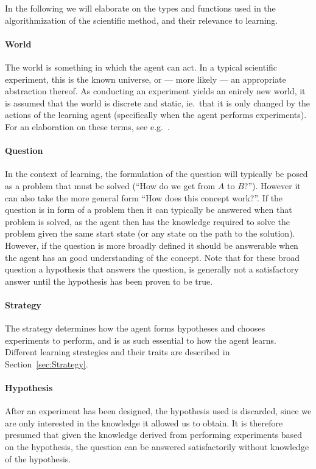 \documentclass[\master/Master.tex]{subfiles}
\begin{document}
In the following we will elaborate on the types and functions used in the algorithmization of the scientific method, and their relevance to learning.

\paragraph*{World}
The world is something in which the agent can act. In a typical scientific experiment, this is the known universe, or --- more likely --- an appropriate abstraction thereof. As conducting an experiment yields an enirely new world, it is assumed that the world is discrete and static, ie.\ that it is only changed by the actions of the learning agent (specifically when the agent performs experiments). For an elaboration on these terms, see e.g.~\cite{Russell}. 

\paragraph*{Question}
In the context of learning, the formulation of the question will typically be posed as a problem that must be solved (``How do we get from $A$ to $B$?'').
However it can also take the more general form ``How does this concept work?''.
If the question is in form of a problem then it can typically be answered when that problem is solved, 
as the agent then has the knowledge required to solve the problem given the same start state (or any state on the path to the solution). 
However, if the question is more broadly defined it should be answerable when the agent has an good understanding of the concept. 
Note that for these broad question a hypothesis that answers the question, is generally not a satisfactory answer until the hypothesis has been proven to be true.


\paragraph*{Strategy}
The strategy determines how the agent forms hypotheses and chooses experiments to perform, and is as such essential to how the agent learns. Different learning strategies and their traits are described in Section~\ref{sec:Strategy}.

\paragraph*{Hypothesis}
After an experiment has been designed, the hypothesis used is discarded, since we are only interested in the knowledge it allowed us to obtain. It is therefore presumed that given the knowledge derived from performing experiments based on the hypothesis, the question can be answered satisfactorily without knowledge of the hypothesis.
\end{document}
